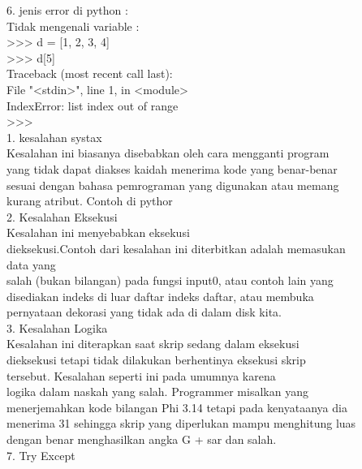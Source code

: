 6. jenis error di python :\\
Tidak mengenali variable :\\
>>> d = [1, 2, 3, 4]\\
>>> d[5]\\
Traceback (most recent call last):\\
  File "<stdin>", line 1, in <module>\\
IndexError: list index out of range\\
>>>\\
1. kesalahan systax\\
Kesalahan ini biasanya disebabkan oleh cara mengganti program\\ yang tidak dapat diakses kaidah menerima kode yang benar-benar\\ sesuai dengan bahasa pemrograman yang digunakan atau memang\\ kurang atribut. Contoh di pythor\\
2. Kesalahan Eksekusi \\
Kesalahan ini menyebabkan eksekusi\\ dieksekusi.Contoh dari kesalahan ini diterbitkan adalah memasukan\\ data yang\\ salah (bukan bilangan) pada fungsi input0, atau contoh lain yang\\ disediakan indeks di luar daftar indeks daftar, atau membuka\\ pernyataan dekorasi yang tidak ada di dalam disk kita.\\
3. Kesalahan Logika\\ 
Kesalahan ini diterapkan saat skrip sedang dalam eksekusi\\ dieksekusi tetapi tidak dilakukan berhentinya eksekusi skrip\\ tersebut. Kesalahan seperti ini pada umumnya karena\\
logika dalam naskah yang salah. Programmer misalkan yang\\ menerjemahkan kode bilangan Phi 3.14 tetapi pada kenyataanya dia\\ menerima 31 sehingga skrip yang diperlukan mampu menghitung luas\\ dengan benar menghasilkan angka G + sar dan salah.\\
7. Try Except\\
